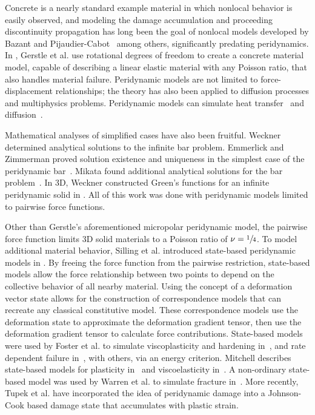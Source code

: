 Concrete is a nearly standard example material in which nonlocal behavior is easily observed, and modeling the damage accumulation and proceeding discontinuity propagation has long been the goal of nonlocal models developed by Bazant and Pijaudier-Cabot~\cite{bazant1988nonlocal} among others, significantly predating peridynamics.
In \cite{gerstle2007peridynamic}, Gerstle et al. use rotational degrees of freedom to create a concrete material model, capable of describing a linear elastic material with any Poisson ratio, that also handles material failure.
Peridynamic models are not limited to force-displacement relationships; the theory has also been applied to diffusion processes and multiphysics problems.
Peridynamic models can simulate heat transfer~\cite{bobaru2010peridynamic} and diffusion~\cite{burch2011classical}.

Mathematical analyses of simplified cases have also been fruitful.
Weckner~\cite{weckner2005effect} determined analytical solutions to the infinite bar problem. 
Emmerlick and Zimmerman proved solution existence and uniqueness in the simplest case of the peridynamic bar~\cite{emmrich2007analysis}.
Mikata found additional analytical solutions for the bar problem~\cite{mikata2012analytical}.
In 3D, Weckner constructed Green's functions for an infinite peridynamic solid in \cite{weckner2009green}.
All of this work was done with peridynamic models limited to pairwise force functions.

Other than Gerstle's aforementioned micropolar peridynamic model, the pairwise force function limits 3D solid materials to a Poisson ratio of  \(\nu=\sfrac{1}{4}\). 
To model additional material behavior, Silling et al. introduced state-based peridynamic models in \cite{silling2007peridynamic}.
By freeing the force function from the pairwise restriction, state-based models allow the force relationship between two points to depend on the collective behavior of all nearby material.
Using the concept of a deformation vector state allows for the construction of correspondence models that can recreate any classical constitutive model.
These correspondence models use the deformation state to approximate the deformation gradient tensor, then use the deformation gradient tensor to calculate force contributions.
State-based models were used by Foster et al. to simulate viscoplasticity and hardening in~\cite{foster2010viscoplasticity}, and rate dependent failure in~\cite{foster2011energy}, with others, via an energy criterion.
Mitchell describes state-based models for plasticity in~\cite{mitchell2011nonlocal} and viscoelasticity in~\cite{mitchell2011non}.
A non-ordinary state-based model was used by Warren et al. to simulate fracture in~\cite{warren2009non}.
More recently, Tupek et al. have incorporated the idea of peridynamic damage into a Johnson-Cook based damage state that accumulates with plastic strain\cite{tupek2013approach}.
%
